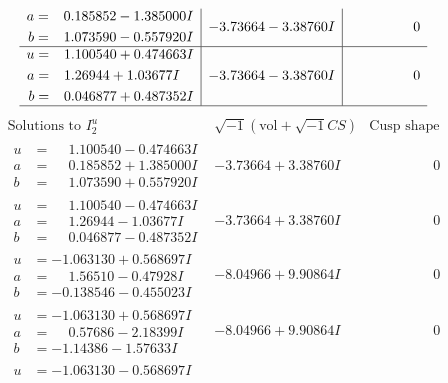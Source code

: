 \documentclass[1p]{elsarticle_modified}
\theoremstyle{definition}
\newcommand{\I}{\sqrt{-1}}
\begin{document}
$$\begin{array}{c|c|c}
\begin{aligned}
a &= \phantom{-}0.185852 - 1.385000 I \\
b &= \phantom{-}1.073590 - 0.557920 I\end{aligned}
 & -3.73664 - 3.38760 I & \phantom{-0.000000 } 0 \\ \hline\begin{aligned}
u &= \phantom{-}1.100540 + 0.474663 I \\
a &= \phantom{-}1.26944 + 1.03677 I \\
b &= \phantom{-}0.046877 + 0.487352 I\end{aligned}
 & -3.73664 - 3.38760 I & \phantom{-0.000000 } 0\\
 \hline 
 \end{array}$$\newpage$$\begin{array}{c|c|c}  
\text{Solutions to }I^u_{2}& \I (\text{vol} + \sqrt{-1}CS) & \text{Cusp shape}\\
 \hline 
\begin{aligned}
u &= \phantom{-}1.100540 - 0.474663 I \\
a &= \phantom{-}0.185852 + 1.385000 I \\
b &= \phantom{-}1.073590 + 0.557920 I\end{aligned}
 & -3.73664 + 3.38760 I & \phantom{-0.000000 } 0 \\ \hline\begin{aligned}
u &= \phantom{-}1.100540 - 0.474663 I \\
a &= \phantom{-}1.26944 - 1.03677 I \\
b &= \phantom{-}0.046877 - 0.487352 I\end{aligned}
 & -3.73664 + 3.38760 I & \phantom{-0.000000 } 0 \\ \hline\begin{aligned}
u &= -1.063130 + 0.568697 I \\
a &= \phantom{-}1.56510 - 0.47928 I \\
b &= -0.138546 - 0.455023 I\end{aligned}
 & -8.04966 + 9.90864 I & \phantom{-0.000000 } 0 \\ \hline\begin{aligned}
u &= -1.063130 + 0.568697 I \\
a &= \phantom{-}0.57686 - 2.18399 I \\
b &= -1.14386 - 1.57633 I\end{aligned}
 & -8.04966 + 9.90864 I & \phantom{-0.000000 } 0 \\ \hline\begin{aligned}
u &= -1.063130 - 0.568697 I \\

\end{aligned}
\end{array}$$
\end{document}
